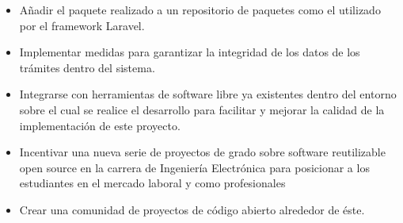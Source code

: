 \begin{itemize}
	\item Añadir el paquete realizado a un repositorio de paquetes como el
	      utilizado por el framework Laravel.

	\item Implementar medidas para garantizar la integridad de los datos de los
	      trámites dentro del sistema.

	\item Integrarse con herramientas de software libre ya existentes dentro del
	      entorno sobre el cual se realice el desarrollo para facilitar y mejorar
	      la calidad de la implementación de este proyecto.

	\item Incentivar una nueva serie de proyectos de grado sobre software
	      reutilizable open source en la carrera de Ingeniería Electrónica para
	      posicionar a los estudiantes en el mercado laboral y como profesionales

	\item Crear una comunidad de proyectos de código abierto alrededor de éste.
\end{itemize}